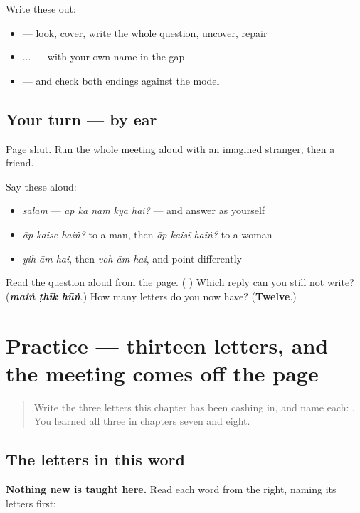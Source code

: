 Write these out:

\begin{itemize}
\raggedright
  \item {}     — look, cover, write the whole question, uncover, repair
  \item {}  ...  — with your own name in the gap
  \item {}   — and check both endings against the model
\end{itemize}

\subsection*{Your turn — by ear}
Page shut. Run the whole meeting aloud with an imagined stranger, then a friend.

Say these aloud:

\begin{itemize}
\raggedright
  \item \emph{salām} — \emph{āp kā nām kyā hai?} — and answer as yourself
  \item \emph{āp kaise haiṅ?} to a man, then \emph{āp kaisī haiṅ?} to a woman
  \item \emph{yih ām hai}, then \emph{voh ām hai}, and point differently
\end{itemize}

\begin{tcolorbox}[breakable,colback=teal!4,colframe=teal!35!black,title={Before you move on}]
Read the question aloud from the page. (\textbf{    }) Which reply can you still not write? (\emph{\textbf{maiṅ ṭhīk hūṅ}}.) How many letters do you now have? (\textbf{Twelve}.)
\end{tcolorbox}
\section[Practice]{Practice — thirteen letters, and the meeting comes off the page}

\label{lesson:UR-C18-practice}



\begin{quote}
Write the three letters this chapter has been cashing in, and name each:   . You learned all three in chapters seven and eight.
\end{quote}

\subsection*{The letters in this word}
\textbf{Nothing new is taught here.} Read each word from the right, naming its letters first:

